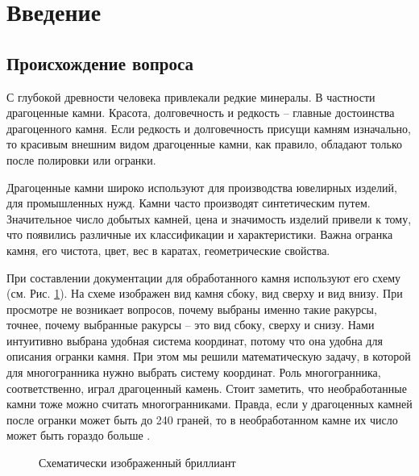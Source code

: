\documentclass[a4paper,12pt, titlepage]{article}
\begin{document}
\newpage
\section{Введение}
\subsection{Происхождение вопроса}
С глубокой древности человека привлекали редкие минералы. В частности драгоценные камни.
Красота, долговечность и редкость -- главные достоинства драгоценного камня. 
Если редкость и долговечность присущи камням изначально,
то красивым внешним видом драгоценные камни, как правило, обладают только после полировки или огранки.

Драгоценные камни широко используют для производства ювелирных изделий, для промышленных нужд.  
Камни часто производят синтетическим путем. Значительное число добытых камней, цена и значимость изделий привели к тому, что 
появились различные их классификации и характеристики. Важна огранка камня, 
его чистота, цвет, вес в каратах, геометрические свойства.

При составлении документации для обработанного камня используют его схему (см. Рис. \ref{diamond}). На схеме
 изображен вид камня сбоку, вид сверху и вид внизу. При просмотре не возникает вопросов, почему выбраны именно такие 
ракурсы, точнее, почему выбранные ракурсы -- это вид сбоку, сверху и снизу. Нами интуитивно выбрана удобная система 
координат, потому что она удобна для описания огранки камня. При этом мы решили математическую задачу, в которой для 
многогранника нужно выбрать систему координат. Роль многогранника, соответственно, играл драгоценный камень. 
Стоит заметить, что необработанные камни тоже можно считать многогранниками. Правда, если у драгоценных камней после огранки 
может быть до 240 граней, то в необработанном камне их число может быть гораздо больше \cite{3dbook,wiki-ogranka}.   

\begin{figure}[h]
\noindent{}
\caption{Схематически изображенный бриллиант}
\label{diamond}
\end{figure}
\end{document}

